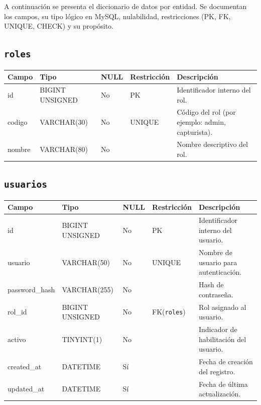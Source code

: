 \documentclass[12pt,a4paper]{article}
\begin{document}
A continuación se presenta el diccionario de datos por entidad. Se documentan los campos, su tipo lógico en MySQL, nulabilidad, restricciones (PK, FK, UNIQUE, CHECK) y su propósito.

\subsection{\texttt{roles}}
\begin{longtable}{L{3.2cm} L{3.2cm} C{1.2cm} L{2.6cm} L{5.2cm}}
\toprule
\textbf{Campo} & \textbf{Tipo} & \textbf{NULL} & \textbf{Restricción} & \textbf{Descripción} \\
\midrule
\endhead
id & BIGINT UNSIGNED & No & PK & Identificador interno del rol. \\
codigo & VARCHAR(30) & No & UNIQUE & Código del rol (por ejemplo: admin, capturista). \\
nombre & VARCHAR(80) & No &  & Nombre descriptivo del rol. \\
\bottomrule
\end{longtable}

\subsection{\texttt{usuarios}}
\begin{longtable}{L{3.2cm} L{3.2cm} C{1.2cm} L{2.6cm} L{5.2cm}}
\toprule
\textbf{Campo} & \textbf{Tipo} & \textbf{NULL} & \textbf{Restricción} & \textbf{Descripción} \\
\midrule
\endhead
id & BIGINT UNSIGNED & No & PK & Identificador interno del usuario. \\
usuario & VARCHAR(50) & No & UNIQUE & Nombre de usuario para autenticación. \\
password\_hash & VARCHAR(255) & No &  & Hash de contraseña. \\
rol\_id & BIGINT UNSIGNED & No & FK(\texttt{roles}) & Rol asignado al usuario. \\
activo & TINYINT(1) & No &  & Indicador de habilitación del usuario. \\
created\_at & DATETIME & Sí &  & Fecha de creación del registro. \\
updated\_at & DATETIME & Sí &  & Fecha de última actualización. \\
\bottomrule
\end{longtable}

\end{document}
